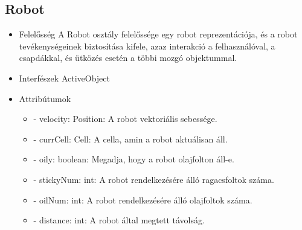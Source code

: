 \subsection{Robot}
\begin{itemize}
	\item Felelősség\newline
	A Robot osztály felelőssége egy robot reprezentációja, és a robot tevékenységeinek biztosítása kifele, azaz interakció a felhasználóval, a csapdákkal, és ütközés esetén a többi mozgó objektummal.
	
	\item Interfészek\newline
	ActiveObject
	\item Attribútumok
	\begin{itemize}
		\item - velocity: Position: A robot vektoriális sebessége.
		\item - currCell: Cell: A cella, amin a robot aktuálisan áll.
		\item - oily: boolean: Megadja, hogy a robot olajfolton áll-e.
		\item - stickyNum: int: A robot rendelkezésére álló ragacsfoltok száma.
		\item - oilNum: int: A robot rendelkezésére álló olajfoltok száma.
		\item - distance: int: A robot által megtett távolság.
		

\end{itemize}
\end{itemize}
